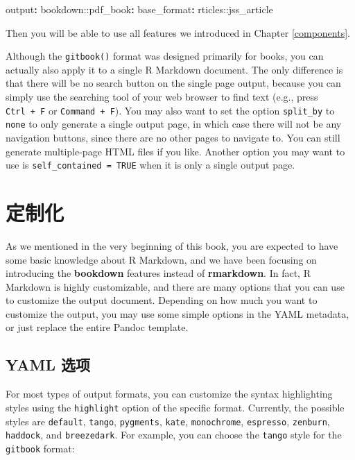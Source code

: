 \documentclass[
  12pt,
]{krantz}
\newenvironment{Shaded}{\begin{snugshade}}{\end{snugshade}}
\newcommand{\AttributeTok}[1]{\textcolor[rgb]{0.77,0.63,0.00}{#1}}
\newcommand{\FunctionTok}[1]{\textcolor[rgb]{0.00,0.00,0.00}{#1}}
\newcommand{\KeywordTok}[1]{\textcolor[rgb]{0.13,0.29,0.53}{\textbf{#1}}}
\theoremstyle{definition}
\theoremstyle{definition}
\theoremstyle{definition}
\theoremstyle{definition}
\theoremstyle{remark}
\begin{document}
\begin{Shaded}
\begin{Highlighting}[]
\FunctionTok{output}\KeywordTok{:}
\AttributeTok{  bookdown:}\FunctionTok{:pdf\_book}\KeywordTok{:}
\AttributeTok{    }\FunctionTok{base\_format}\KeywordTok{:}\AttributeTok{ rticles::jss\_article}
\end{Highlighting}
\end{Shaded}

Then you will be able to use all features we introduced in Chapter \ref{components}.

Although the \texttt{gitbook()} format was designed primarily for books, you can actually also apply it to a single R Markdown document. The only difference is that there will be no search button on the single page output, because you can simply use the searching tool of your web browser to find text (e.g., press \texttt{Ctrl\ +\ F} or \texttt{Command\ +\ F}). You may also want to set the option \texttt{split\_by} to \texttt{none} to only generate a single output page, in which case there will not be any navigation buttons, since there are no other pages to navigate to. You can still generate multiple-page HTML files if you like. Another option you may want to use is \texttt{self\_contained\ =\ TRUE} when it is only a single output page.

\hypertarget{customization}{%
\chapter{定制化}\label{customization}}

As we mentioned in the very beginning of this book, you are expected to have some basic knowledge about R Markdown, and we have been focusing on introducing the \textbf{bookdown} features instead of \textbf{rmarkdown}. In fact, R Markdown is highly customizable, and there are many options that you can use to customize the output document. Depending on how much you want to customize the output, you may use some simple options in the YAML metadata, or just replace the entire Pandoc template.

\hypertarget{yaml-options}{%
\section{YAML 选项}\label{yaml-options}}

For most types of output formats, you can customize the syntax highlighting styles using the \texttt{highlight} option of the specific format. Currently, the possible styles are \texttt{default}, \texttt{tango}, \texttt{pygments}, \texttt{kate}, \texttt{monochrome}, \texttt{espresso}, \texttt{zenburn}, \texttt{haddock}, and \texttt{breezedark}. For example, you can choose the \texttt{tango} style for the \texttt{gitbook} format:
\end{document}
